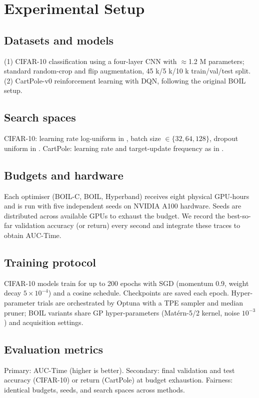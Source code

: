 \documentclass{article} %
\begin{document}
\section{Experimental Setup}
\label{sec:experimental}
\subsection{Datasets and models}
(1) CIFAR-10 classification using a four-layer CNN with \(\approx\)1.2 M parameters; standard random-crop and flip augmentation, 45 k/5 k/10 k train/val/test split. (2) CartPole-v0 reinforcement learning with DQN, following the original BOIL setup.

\subsection{Search spaces}
CIFAR-10: learning rate log-uniform in , batch size \(\in\{32,64,128\}\), dropout uniform in . CartPole: learning rate and target-update frequency as in \cite{nguyen-2019-bayesian}.

\subsection{Budgets and hardware}
Each optimiser (BOIL-C, BOIL, Hyperband) receives eight physical GPU-hours and is run with five independent seeds on NVIDIA A100 hardware. Seeds are distributed across available GPUs to exhaust the budget. We record the best-so-far validation accuracy (or return) every second and integrate these traces to obtain AUC-Time.

\subsection{Training protocol}
CIFAR-10 models train for up to 200 epochs with SGD (momentum 0.9, weight decay \(5\times 10^{-4}\)) and a cosine schedule. Checkpoints are saved each epoch. Hyper-parameter trials are orchestrated by Optuna with a TPE sampler and median pruner; BOIL variants share GP hyper-parameters (Mat\'ern-5/2 kernel, noise \(10^{-3}\)) and acquisition settings.

\subsection{Evaluation metrics}
Primary: AUC-Time (higher is better). Secondary: final validation and test accuracy (CIFAR-10) or return (CartPole) at budget exhaustion. Fairness: identical budgets, seeds, and search spaces across methods.
\end{document}
